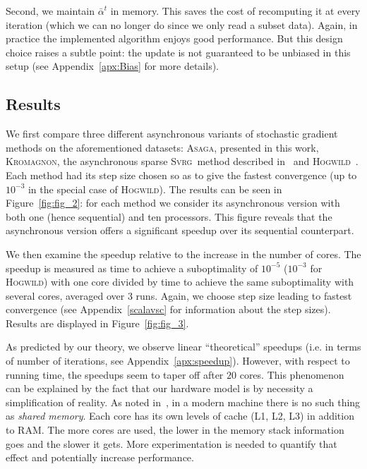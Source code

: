 \documentclass[twoside]{article}
\newcommand{\ASAGA}{\textsc{Asaga}}
\newcommand{\SVRG}{\textsc{Svrg}}
\newcommand{\Hogwild}{\textsc{Hogwild}}
\newcommand{\KROMAGNON}{\textsc{Kromagnon}}
\begin{document}
Second, we maintain $\bar \alpha^t$ in memory. 
This saves the cost of recomputing it at every iteration (which we can no longer do since we only read a subset data). 
Again, in practice the implemented algorithm enjoys good performance. 
But this design choice raises a subtle point: the update is not guaranteed to be unbiased in this setup (see Appendix~\ref{apx:Bias} for more details). 

\vspace{-2mm}
\subsection{Results}\label{ssec:results}
\vspace{-2mm}
We first compare three different asynchronous variants of stochastic gradient methods on the aforementioned datasets: \ASAGA, presented in this work, \KROMAGNON, the asynchronous sparse \SVRG\ method described in~\citet{mania} and \Hogwild~\citep{hogwild}.
Each method had its step size chosen so as to give the fastest convergence (up to $10^{-3}$ in the special case of \Hogwild). 
The results can be seen in Figure~\ref{fig:fig_2}: for each method we consider its asynchronous version with both one (hence sequential) and ten processors. 
This figure reveals that the asynchronous version offers a significant speedup over its sequential counterpart.

We then examine the speedup relative to the increase in the number of cores. 
The speedup is measured as time to achieve a suboptimality of $10^{-5}$ ($10^{-3}$ for \Hogwild) with one core divided by time to achieve the same suboptimality with several cores, averaged over 3 runs. 
Again, we choose step size leading to fastest convergence (see Appendix~\ref{scalavsc} for information about the step sizes). Results are displayed in Figure~\ref{fig:fig_3}. 

As predicted by our theory, we observe linear ``theoretical'' speedups (i.e. in terms of number of iterations, see Appendix~\ref{apx:speedup}).
However, with respect to running time, the speedups seem to taper off after $20$ cores.
This phenomenon can be explained by the fact that our hardware model is by necessity a simplification of reality. 
As noted in~\citet{duchi}, in a modern machine there is no such thing as \textit{shared memory}. 
Each core has its own levels of cache (L1, L2, L3) in addition to RAM. 
The more cores are used, the lower in the memory stack information goes and the slower it gets. 
More experimentation is needed to quantify that effect and potentially increase performance.
\end{document}
